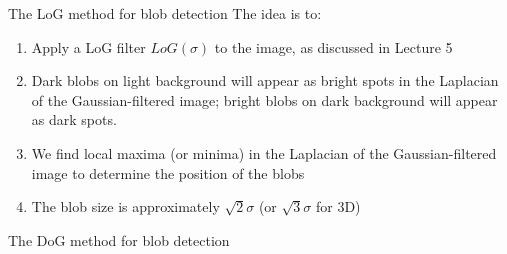 \documentclass[9pt, aspectratio=169]{beamer}
\begin{document}
\begin{frame}
    {The LoG method for blob detection}
    The idea is to:

    \begin{enumerate}
        \item Apply a LoG filter $LoG(\sigma)$ to the image, as discussed in Lecture 5
        \item Dark blobs on light background will appear as bright spots in the Laplacian of the Gaussian-filtered image; bright blobs on dark background will appear as dark spots.
              \pause
        \item We find local maxima (or minima) in the Laplacian of the Gaussian-filtered image to determine the position of the blobs
        \item The blob size is approximately $\sqrt{2}\sigma$ (or $\sqrt{3}\sigma$ for 3D)
    \end{enumerate}
\end{frame}

\begin{frame}
    {The DoG method for blob detection}

    \pause


\end{frame}
\end{document}
